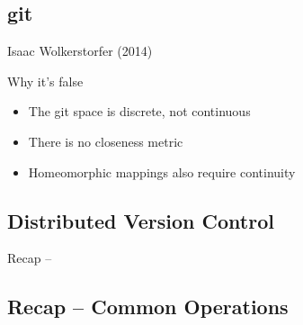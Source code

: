
\subsection{git}

\begin{frame}[b]
	\begin{fancycolumns}[animation=none]
		\begin{center}
		\end{center}
		\vspace{-7mm}
		
		\begin{note}{Isaac Wolkerstorfer (2014) }
		\end{note} \pause
		\nextcolumn
		\begin{note}{Why it's false}
			\begin{itemize}
				\item The git space is discrete, not continuous
				\item There is no closeness metric
				\item Homeomorphic mappings also require continuity
			\end{itemize}
		\end{note} \pause
	\end{fancycolumns}
\end{frame}


\subsection{Distributed Version Control}
\begin{frame}{Recap -- \insertsubsection}
	\slideDistributedVC
\end{frame}

\subsection{Recap -- Common Operations}

\slideCloneFetch{}

\slideCommitPush{}

